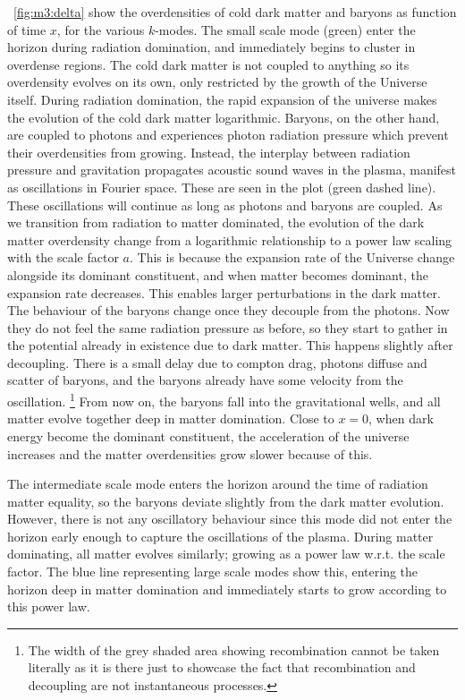     ~\cref{fig:m3:delta} show the overdensities of cold dark matter and baryons as function of time $x$, for the various $k$-modes. The small scale mode (green) enter the horizon during radiation domination, and immediately begins to cluster in overdense regions. The cold dark matter is not coupled to anything so its overdensity evolves on its own, only restricted by the growth of the Universe itself. During radiation domination, the rapid expansion of the universe makes the evolution of the cold dark matter logarithmic. Baryons, on the other hand, are coupled to photons and experiences photon radiation pressure which prevent their overdensities from growing. Instead, the interplay between radiation pressure and gravitation propagates acoustic sound waves in the plasma, manifest as oscillations in Fourier space. These are seen in the plot (green dashed line). These oscillations will continue as long as photons and baryons are coupled. As we transition from radiation to matter dominated, the evolution of the dark matter overdensity change from a logarithmic relationship to a power law scaling with the scale factor $a$. This is because the expansion rate of the Universe change alongside its dominant constituent, and when matter becomes dominant, the expansion rate decreases. This enables larger perturbations in the dark matter. The behaviour of the baryons change once they decouple from the photons. Now they do not feel the same radiation pressure as before, so they start to gather in the potential already in existence due to dark matter. This happens slightly after decoupling. There is a small delay due to compton drag, photons diffuse and scatter of baryons, and the baryons already have some velocity from the oscillation. \footnote{The width of the grey shaded area showing recombination cannot be taken literally as it is there just to showcase the fact that recombination and decoupling are not instantaneous processes.} From now on, the baryons fall into the gravitational wells, and all matter evolve together deep in matter domination. Close to $x=0$, when dark energy become the dominant constituent, the acceleration of the universe increases and the matter overdensities grow slower because of this.

    The intermediate scale mode enters the horizon around the time of radiation matter equality, so the baryons deviate slightly from the dark matter evolution. However, there is not any oscillatory behaviour since this mode did not enter the horizon early enough to capture the oscillations of the plasma. During matter dominating, all matter evolves similarly; growing as a power law w.r.t. the scale factor. The blue line representing large scale modes show this, entering the horizon deep in matter domination and immediately starts to grow according to this power law. 
    

